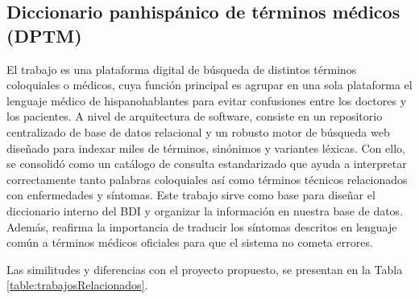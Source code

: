\subsection [Diccionario panhispánico de términos médicos]{Diccionario panhispánico de términos médicos ({DPTM})}
El trabajo \cite{DPTM} es una plataforma digital de búsqueda de distintos términos coloquiales o médicos, cuya función principal es agrupar en una sola plataforma el lenguaje médico de hispanohablantes para evitar confusiones entre los doctores y los pacientes. A nivel de arquitectura de software, consiste en un repositorio centralizado de base de datos relacional y un robusto motor de búsqueda web diseñado para indexar miles de términos, sinónimos y variantes léxicas. Con ello, se consolidó como un catálogo de consulta estandarizado que ayuda a interpretar correctamente tanto palabras coloquiales así como términos técnicos relacionados con enfermedades y síntomas. Este trabajo sirve como base para diseñar el diccionario interno del BDI y organizar la información en nuestra base de datos. Además, reafirma la importancia de traducir los síntomas descritos en lenguaje común a términos médicos oficiales para que el sistema no cometa errores.


Las similitudes y diferencias con el proyecto propuesto, se presentan en la Tabla \ref{table:trabajosRelacionados}.

